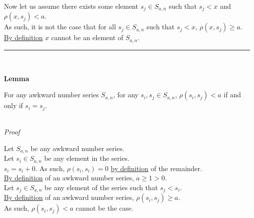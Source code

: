 \documentclass[a4paper,12pt]{article}
\begin{document}
\noindent Now let us assume there exists some element $s_j \in S_{a, n}$ such that $s_j < x$ and $\rho(x, s_j) < a$.\\

\noindent As such, it is not the case that for all $s_j \in S_{a, n}$ such that $s_j < x$, $\rho(x, s_j) \geq a$.\\

\noindent \hyperlink{definition:awkward_number_series}{By definition} $x$ cannot be an element of $S_{a, n}$.


\begin{center}
\noindent\rule{8cm}{0.4pt}
\end{center}
\noindent \\









\label{lemma:non_divisibility_of_elements}
\hypertarget{lemma:non_divisibility_of_elements}{}
\begin{tcolorbox}
\textbf{Lemma}

For any awkward number series $S_{a, n}$, for any $s_i, s_j \in S_{a, n}$, $\rho(s_i, s_j) < a$ if and only if $s_i = s_j$.
\end{tcolorbox}

\noindent \\
\textit{Proof}

\noindent Let $S_{a, n}$ be any awkward number series.\\

\noindent Let $s_i \in S_{a, n}$ be any element in the series.\\

\noindent $s_i = s_i + 0$. As such, $\rho(s_i, s_i) = 0$ \hyperlink{theorem:remainder_theorem}{by definition} of the remainder.\\

\noindent \hyperlink{definition:awkward_number_series}{By definition} of an awkward number series, $a \geq 1 > 0$.\\

\noindent Let $s_j \in S_{a, n}$ be any element of the series such that $s_j < s_i$.\\

\noindent \hyperlink{definition:awkward_number_series}{By definition} of an awkward number series, $\rho(s_i, s_j) \geq a$.\\

\noindent As such, $\rho(s_i, s_j) < a$ cannot be the case.\\
\end{document}
